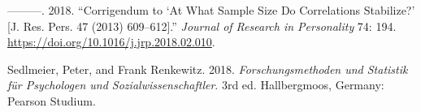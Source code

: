 \begin{CSLReferences}{1}{0}
\leavevmode{}%
---------. 2018. {``Corrigendum to {`{At What Sample Size Do Correlations Stabilize}?'} {[}{J}. {Res}. {Pers}. 47 (2013) 609--612{]}.''} \emph{Journal of Research in Personality} 74: 194. \url{https://doi.org/10.1016/j.jrp.2018.02.010}.

\leavevmode{}%
Sedlmeier, Peter, and Frank Renkewitz. 2018. \emph{Forschungsmethoden und Statistik für Psychologen und Sozialwissenschaftler}. 3rd ed. {Hallbergmoos, Germany}: {Pearson Studium}.

\end{CSLReferences}



\address{%
Johannes Titz\\
Chemnitz University of Technology\\%
Department of Psychology\\ Chemnitz, Germany\\
%
\url{https://johannestitz.com}\\%
\textit{ORCiD: \href{https://orcid.org/0000-0002-1102-5719}{0000-0002-1102-5719}}\\%
\href{mailto:johannes.titz@psychologie.tu-chemnitz.de}{\nolinkurl{johannes.titz@psychologie.tu-chemnitz.de}}%
}

